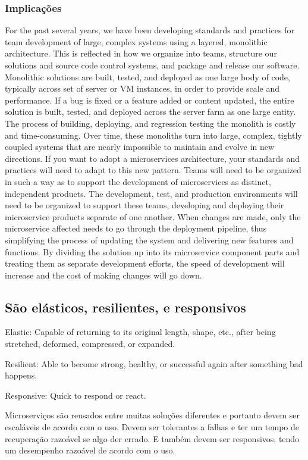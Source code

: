 \subsubsection*{Implicações}
For the past several years, we have been developing standards and practices for team development of large, complex systems using a layered, monolithic architecture. This is reflected in how we organize into teams, structure our solutions and source code control systems, and package and release our software. Monolithic solutions are built, tested, and deployed as one large body of code, typically across set of server or VM instances, in order to provide scale and performance. If a bug is fixed or a feature added or content updated, the entire solution is built, tested, and deployed across the server farm as one large entity. The process of building, deploying, and regression testing the monolith is costly and time-consuming. Over time, these monoliths turn into large, complex, tightly coupled systems that are nearly impossible to maintain and evolve in new directions. If you want to adopt a microservices architecture, your standards and practices will need to adapt to this new pattern. Teams will need to be organized in such a way as to support the development of microservices as distinct, independent products. The development, test, and production environments will need to be organized to support these teams, developing and deploying their microservice products separate of one another. When changes are made, only the microservice affected needs to go through the deployment pipeline, thus simplifying the process of updating the system and delivering new features and functions. By dividing the solution up into its microservice component parts and treating them as separate development efforts, the speed of development will increase and the cost of making changes will go down.

\subsection{São elásticos, resilientes, e responsivos}

Elastic: Capable of returning to its original length, shape, etc., after being stretched, deformed, compressed, or expanded.

Resilient: Able to become strong, healthy, or successful again after something bad happens.

Responsive: Quick to respond or react.

Microserviços são reusados entre muitas soluções diferentes e portanto devem ser escaláveis de acordo com o uso. Devem ser tolerantes a falhas e ter um tempo de recuperação razoável se algo der errado. E também devem ser responsivos, tendo um desempenho razoável de acordo com o uso.

